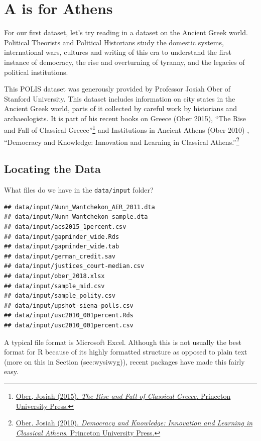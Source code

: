 \documentclass[]{book}
\let\rmarkdownfootnote\footnote%
\def\footnote{\protect\rmarkdownfootnote}
\theoremstyle{definition}
\theoremstyle{definition}
\theoremstyle{definition}
\theoremstyle{remark}
\begin{document}
\hypertarget{a-is-for-athens}{%
\section{A is for Athens}\label{a-is-for-athens}}

For our first dataset, let's try reading in a dataset on the Ancient Greek world. Political Theorists and Political Historians study the domestic systems, international wars, cultures and writing of this era to understand the first instance of democracy, the rise and overturning of tyranny, and the legacies of political institutions.

This POLIS dataset was generously provided by Professor Josiah Ober of Stanford University. This dataset includes information on city states in the Ancient Greek world, parts of it collected by careful work by historians and archaeologists. It is part of his recent books on Greece (Ober 2015), ``The Rise and Fall of Classical Greece''\footnote{\href{https://press.princeton.edu/titles/10423.html}{Ober, Josiah (2015). \emph{The Rise and Fall of Classical Greece}. Princeton University Press.}} and Institutions in Ancient Athens (Ober 2010) , ``Democracy and Knowledge: Innovation and Learning in Classical Athens.''\footnote{\href{https://press.princeton.edu/titles/8742.html}{Ober, Josiah (2010). \emph{Democracy and Knowledge: Innovation and Learning in Classical Athens}. Princeton University Press.}}

\hypertarget{locating-the-data}{%
\subsection{Locating the Data}\label{locating-the-data}}

What files do we have in the \texttt{data/input} folder?

\begin{verbatim}
## data/input/Nunn_Wantchekon_AER_2011.dta
## data/input/Nunn_Wantchekon_sample.dta
## data/input/acs2015_1percent.csv
## data/input/gapminder_wide.Rds
## data/input/gapminder_wide.tab
## data/input/german_credit.sav
## data/input/justices_court-median.csv
## data/input/ober_2018.xlsx
## data/input/sample_mid.csv
## data/input/sample_polity.csv
## data/input/upshot-siena-polls.csv
## data/input/usc2010_001percent.Rds
## data/input/usc2010_001percent.csv
\end{verbatim}

A typical file format is Microsoft Excel. Although this is not usually the best format for R because of its highly formatted structure as opposed to plain text (more on this in Section (sec:wysiwyg)), recent packages have made this fairly easy.
\end{document}
